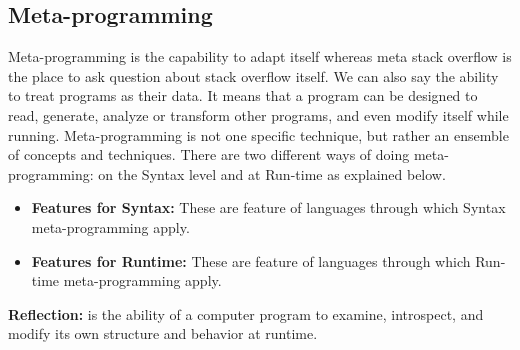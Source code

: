 \documentclass{sig-alternate}
\begin{document}
	\subsection{Meta-programming}
	Meta-programming is the capability to adapt itself whereas meta stack overflow is the place to ask question about stack overflow itself. We can also say the ability to treat programs as their data. It means that a program can be designed to read, generate, analyze or transform other programs, and even modify itself while running. Meta-programming is not one specific technique, but rather an ensemble of concepts and techniques. There are two different ways of doing meta-programming: on the Syntax level and at Run-time as explained below.
	\begin{itemize}
		\item \textbf{Features for Syntax:} These are feature of languages through which Syntax meta-programming apply.
		\item \textbf{Features for Runtime:} These are feature of languages through which Run-time meta-programming apply.
	\end{itemize}
	\textbf{Reflection:} is the ability of a computer program to examine, introspect, and modify its own structure and behavior at runtime.
\end{document}
